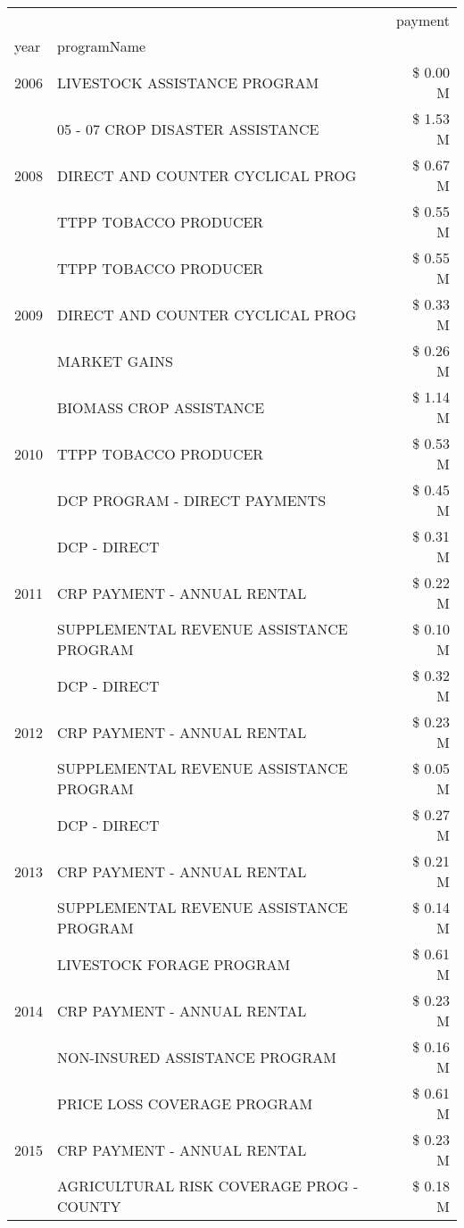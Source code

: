 \begin{tabular}{llr}
\toprule
 &  & payment \\
year & programName &  \\
\midrule
2006 & LIVESTOCK ASSISTANCE PROGRAM & \$ 0.00 M \\
\cline{1-3}
\multirow[t]{3}{*}{2008} & 05 - 07 CROP DISASTER ASSISTANCE & \$ 1.53 M \\
 & DIRECT AND COUNTER CYCLICAL PROG & \$ 0.67 M \\
 & TTPP TOBACCO PRODUCER & \$ 0.55 M \\
\cline{1-3}
\multirow[t]{3}{*}{2009} & TTPP TOBACCO PRODUCER & \$ 0.55 M \\
 & DIRECT AND COUNTER CYCLICAL PROG & \$ 0.33 M \\
 & MARKET GAINS & \$ 0.26 M \\
\cline{1-3}
\multirow[t]{3}{*}{2010} & BIOMASS CROP ASSISTANCE & \$ 1.14 M \\
 & TTPP TOBACCO PRODUCER & \$ 0.53 M \\
 & DCP PROGRAM - DIRECT PAYMENTS & \$ 0.45 M \\
\cline{1-3}
\multirow[t]{3}{*}{2011} & DCP - DIRECT & \$ 0.31 M \\
 & CRP PAYMENT - ANNUAL RENTAL & \$ 0.22 M \\
 & SUPPLEMENTAL REVENUE ASSISTANCE PROGRAM & \$ 0.10 M \\
\cline{1-3}
\multirow[t]{3}{*}{2012} & DCP - DIRECT & \$ 0.32 M \\
 & CRP PAYMENT - ANNUAL RENTAL & \$ 0.23 M \\
 & SUPPLEMENTAL REVENUE ASSISTANCE PROGRAM & \$ 0.05 M \\
\cline{1-3}
\multirow[t]{3}{*}{2013} & DCP - DIRECT & \$ 0.27 M \\
 & CRP PAYMENT - ANNUAL RENTAL & \$ 0.21 M \\
 & SUPPLEMENTAL REVENUE ASSISTANCE PROGRAM & \$ 0.14 M \\
\cline{1-3}
\multirow[t]{3}{*}{2014} & LIVESTOCK FORAGE PROGRAM & \$ 0.61 M \\
 & CRP PAYMENT - ANNUAL RENTAL & \$ 0.23 M \\
 & NON-INSURED ASSISTANCE PROGRAM & \$ 0.16 M \\
\cline{1-3}
\multirow[t]{3}{*}{2015} & PRICE LOSS COVERAGE PROGRAM & \$ 0.61 M \\
 & CRP PAYMENT - ANNUAL RENTAL & \$ 0.23 M \\
 & AGRICULTURAL RISK COVERAGE PROG - COUNTY & \$ 0.18 M \\

\end{tabular}
